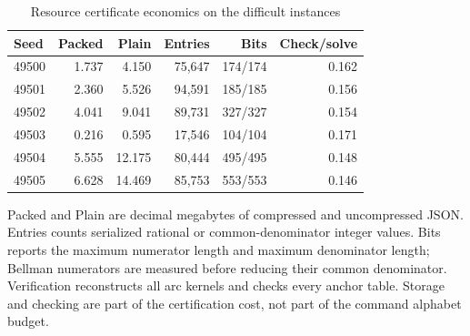 \begin{table}[p]\centering
\caption{Resource certificate economics on the difficult instances}\label{tab:cert52}
\setlength{\tabcolsep}{4pt}
\begin{tabular}{lrrrrr}
\toprule
Seed & Packed & Plain & Entries & Bits & Check/solve\\
\midrule
49500 & 1.737 & 4.150 & 75,647 & 174/174 & 0.162\\
49501 & 2.360 & 5.526 & 94,591 & 185/185 & 0.156\\
49502 & 4.041 & 9.041 & 89,731 & 327/327 & 0.154\\
49503 & 0.216 & 0.595 & 17,546 & 104/104 & 0.171\\
49504 & 5.555 & 12.175 & 80,444 & 495/495 & 0.148\\
49505 & 6.628 & 14.469 & 85,753 & 553/553 & 0.146\\
\bottomrule\end{tabular}
\par\vspace{6pt}\begin{minipage}{\textwidth}Packed and Plain are decimal megabytes of compressed and uncompressed JSON. Entries counts serialized rational or common-denominator integer values. Bits reports the maximum numerator length and maximum denominator length; Bellman numerators are measured before reducing their common denominator. Verification reconstructs all arc kernels and checks every anchor table. Storage and checking are part of the certification cost, not part of the command alphabet budget.\end{minipage}
\end{table}

